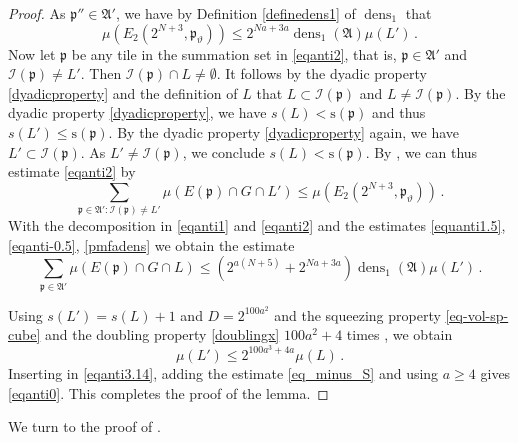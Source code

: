 \documentclass[10pt,a4paper]{article}
\theoremstyle{plain}
\theoremstyle{definition}
\numberwithin{equation}{subsection}
\DeclareMathOperator{\dens}{\operatorname{dens}}
\newcommand{\fp}{{\mathfrak p}}
\newcommand{\ps}{{\mathrm{s}}}
\newcommand{\scI}{{\mathcal{I}}} %
\newcommand{\mfa}{{\vartheta}}
\begin{document}
\begin{proof}
As $\fp''\in \mathfrak{A}'$, we have by Definition
\eqref{definedens1} of $\dens_1$ that
\begin{equation}\label{pmfadens}
   \mu(E_2(2^{N+3}, \fp_{\mfa}))\le 2^{Na+3a}\dens_1(\mathfrak{A}) {\mu(L')}\, .
\end{equation}
Now let $\fp$ be any tile in the summation set in \eqref{eqanti2}, that is, $\fp\in \mathfrak{A}'$ and $\scI(\fp)\neq L'$.
Then $\scI(\fp)\cap L\neq \emptyset$. It follows by the dyadic property \eqref{dyadicproperty}
and the definition of $L$ that
$L\subset \scI(\fp)$ and $L\neq \scI(\fp)$. By the dyadic property \eqref{dyadicproperty}, we have
$s(L)<\ps(\fp)$ and thus $s(L')\le \ps(\fp)$. By the dyadic property
   \eqref{dyadicproperty} again, we have $L'\subset \scI(\fp)$.
As $L'\neq \scI(\fp)$, we conclude $s(L)<\ps(\fp)$.
By , we can thus estimate \eqref{eqanti2} by
\begin{equation}\label{eqanti0.5}
    \sum_{\fp\in\mathfrak{A}':\scI(\fp)\neq L'}\mu(E(\fp)\cap G\cap L')
    \le \mu (E_2(2^{N+3},\fp_{\mfa}))\, .
\end{equation}
With the decomposition in \eqref{eqanti1} and \eqref{eqanti2} and the
estimates \eqref{equanti1.5}, \eqref{eqanti-0.5}, \eqref{pmfadens} we obtain
the estimate
\begin{equation}\label{eqanti3.14}
\sum_{\fp\in\mathfrak{A}'}\mu(E(\fp)\cap G \cap L)
    \le (2^{a(N+5)}+2^{Na+3a})\dens_1(\mathfrak{A})\mu(L')\,.
\end{equation}

Using $s(L')=s(L)+1$ and $D=2^{100a^2}$ and the
squeezing property \eqref{eq-vol-sp-cube}
and the doubling property \eqref{doublingx} $100a^2+4$ times , we obtain
\begin{equation}
    \mu(L')\le 2^{100a^3+4a}\mu(L)\, .
\end{equation}
Inserting in \eqref{eqanti3.14}, adding the estimate \eqref{eq_minus_S} and using $a\ge 4$ gives \eqref{eqanti0}.
This completes the proof of the lemma.
\end{proof}



We turn to the proof of .
\end{document}
